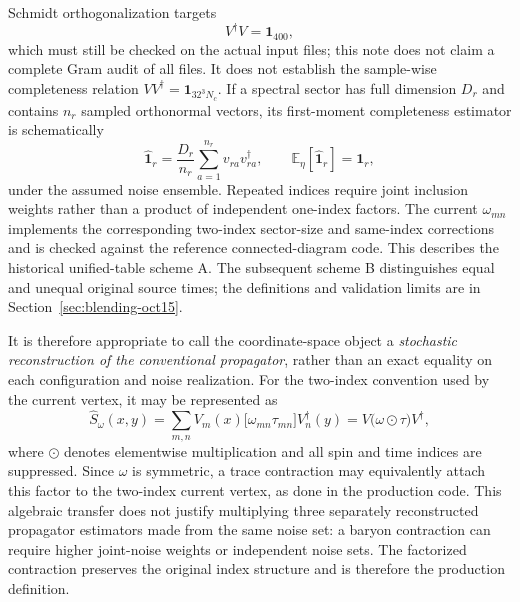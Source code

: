 \documentclass[11pt]{article}
\numberwithin{equation}{section}
\begin{document}
Schmidt orthogonalization targets
\begin{equation}
  V^\dagger V=\mathbf 1_{400},
\end{equation}
which must still be checked on the actual input files; this note does not
claim a complete Gram audit of all files. It does not establish the sample-wise completeness relation
\(VV^\dagger=\mathbf 1_{32^3N_c}\).  If a spectral sector has full dimension
\(D_r\) and contains \(n_r\) sampled orthonormal vectors, its first-moment
completeness estimator is schematically
\begin{equation}
  \widehat{\mathbf 1}_r
  =\frac{D_r}{n_r}\sum_{a=1}^{n_r}v_{ra}v_{ra}^\dagger,
  \qquad
  \mathbb E_\eta[\widehat{\mathbf 1}_r]=\mathbf 1_r,
  \label{eq:stochastic-completeness}
\end{equation}
under the assumed noise ensemble.  Repeated indices require joint inclusion
weights rather than a product of independent one-index factors.  The current
\(\omega_{mn}\) implements the corresponding two-index sector-size and
same-index corrections and is checked against the reference connected-diagram
code. This describes the historical unified-table scheme A. The subsequent
scheme B distinguishes equal and unequal original source times; the
definitions and validation limits are in Section~\ref{sec:blending-oct15}.

It is therefore appropriate to call the coordinate-space object a
\emph{stochastic reconstruction of the conventional propagator}, rather than
an exact equality on each configuration and noise realization.  For the
two-index convention used by the current vertex, it may be represented as
\begin{equation}
  \widehat S_\omega(x,y)
  =\sum_{m,n}V_m(x)
    \bigl[\omega_{mn}\tau_{mn}\bigr]V_n^\dagger(y)
  =V\bigl(\omega\odot\tau\bigr)V^\dagger,
  \label{eq:stochastic-coordinate-propagator}
\end{equation}
where \(\odot\) denotes elementwise multiplication and all spin and time
indices are suppressed.  Since \(\omega\) is symmetric, a trace contraction
may equivalently attach this factor to the two-index current vertex, as done
in the production code.  This algebraic transfer does not justify multiplying
three separately reconstructed propagator estimators made from the same noise
set: a baryon contraction can require higher joint-noise weights or
independent noise sets.  The factorized contraction preserves the original
index structure and is therefore the production definition.
\end{document}
